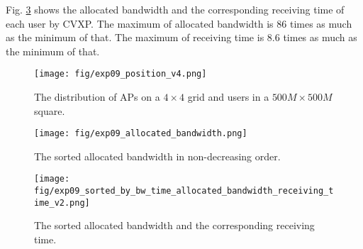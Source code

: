 Fig. \ref{figure:exp09_s_b_b_t_a_b_r_t_v2} shows the allocated bandwidth and the corresponding receiving time of each user by CVXP. The maximum of allocated bandwidth is $86$ times as much as the minimum of that. The maximum of receiving time is $8.6$ times as much as the minimum of that.

\begin{figure}
	\begin{center}
		\texttt{[image: fig/exp09\_position\_v4.png]}
		\caption{The distribution of APs on a $4 \times 4$ grid and users in a $500M \times 500M$ square.}
		\label{figure:exp09_p_v4}
	\end{center}
\end{figure}

\begin{figure}
	\begin{center}
		\texttt{[image: fig/exp09\_allocated\_bandwidth.png]}
		\caption{The sorted allocated bandwidth in non-decreasing order.}
		\label{figure:exp09_a_b}
	\end{center}
\end{figure}

\begin{figure}
	\begin{center}
		\texttt{[image: fig/exp09\_sorted\_by\_bw\_time\_allocated\_bandwidth\_receiving\_time\_v2.png]}
		\caption{The sorted allocated bandwidth and the corresponding receiving time.}
		\label{figure:exp09_s_b_b_t_a_b_r_t_v2}
	\end{center}
\end{figure}	